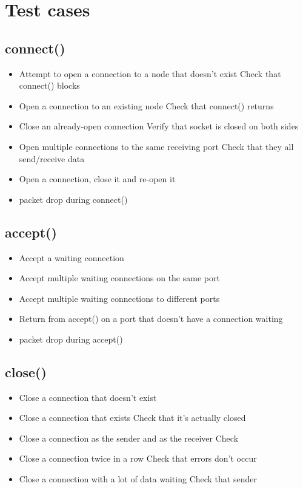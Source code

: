 \documentclass[]{article}
\begin{document}
\section{Test cases}
\subsection{connect()}
\begin{itemize}
	\item Attempt to open a connection to a node that doesn't exist
	\subitem Check that connect() blocks
	\item Open a connection to an existing node
	\subitem Check that connect() returns
	\item Close an already-open connection
	\subitem Verify that socket is closed on both sides
	\item Open multiple connections to the same receiving port
	\subitem Check that they all send/receive data
	\item Open a connection, close it and re-open it
	\item packet drop during connect()
\end{itemize}
\subsection{accept()}
\begin{itemize}
	\item Accept a waiting connection
	\item Accept multiple waiting connections on the same port
	\item Accept multiple waiting connections to different ports
	\item Return from accept() on a port that doesn't have a connection waiting
	\item packet drop during accept()
\end{itemize}
\subsection{close()}
\begin{itemize}
	\item Close a connection that doesn't exist
	\item Close a connection that exists
	\subitem Check that it's actually closed
	\item Close a connection as the sender and as the receiver
	\subitem Check 
	\item Close a connection twice in a row
	\subitem Check that errors don't occur
	\item Close a connection with a lot of data waiting
	\subitem Check that sender 
\end{itemize}
\end{document}
